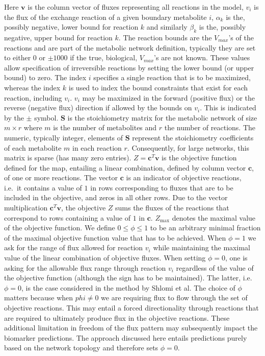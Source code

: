 \documentclass[10pt,a4paper,onecolumn]{article}
\begin{document}
Here \(\bm{v}\) is the column vector of fluxes representing all
reactions in the model, \(v_i\) is the flux of the exchange reaction of
a given boundary metabolite \(i\), \(\alpha_k\) is the, possibly
negative, lower bound for reaction \(k\) and similarly \(\beta_k\) is
the, possibly negative, upper bound for reaction \(k\). The reaction
bounds are the \(V_{max}\)'s of the reactions and are part of the
metabolic network definition, typically they are set to either \(0\) or
\(\pm 1000\) if the true, biological, \(V_{max}\)'s are not known. These
values allow specification of irreversible reactions by setting the
lower bound (or upper bound) to zero. The index \(i\) specifies a single
reaction that is to be maximized, whereas the index \(k\) is used to
index the bound constraints that exist for each reaction, including
\(v_i\). \(v_i\) may be maximized in the forward (positive flux) or the
reverse (negative flux) direction if allowed by the bounds on \(v_i\).
This is indicated by the \(\pm\) symbol. \(\bm{S}\) is the stoichiometry
matrix for the metabolic network of size \(m \times r\) where \(m\) is
the number of metabolites and \(r\) the number of reactions. The
numeric, typically integer, elements of \(\bm{S}\) represent the
stoichiometry coefficients of each metabolite \(m\) in each reaction
\(r\). Consequently, for large networks, this matrix is sparse (has many
zero entries). \(Z = \bm{c}^T \bm{v}\) is the objective function defined
for the map, entailing a linear combination, defined by column vector
\(\bm{c}\), of one or more reactions. The vector \(\bm{c}\) is an
indicator of objective reactions, i.e.~it contains a value of \(1\) in
rows corresponding to fluxes that are to be included in the objective,
and zeros in all other rows. Due to the vector multiplication
\(\bm{c}^T \bm{v}\), the objective \(Z\) sums the fluxes of the
reactions that correspond to rows containing a value of \(1\) in
\(\bm{c}\). \(Z_{\text{max}}\) denotes the maximal value of the
objective function. We define \(0 \leq \phi \leq 1\) to be an arbitrary
minimal fraction of the maximal objective function value that has to be
achieved. When \(\phi=1\) we ask for the range of flux allowed for
reaction \(v_i\) while maintaining the maximal value of the linear
combination of objective fluxes. When setting \(\phi = 0\), one is
asking for the allowable flux range through reaction \(v_i\) regardless
of the value of the objective function (although the sign has to be
maintained). The latter, i.e. \(\phi=0\), is the case considered in the
method by Shlomi et al. The choice of \(\phi\) matters because when
\(phi \neq 0\) we are requiring flux to flow through the set of
objective reactions. This may entail a forced directionality through
reactions that are required to ultimately produce flux in the objective
reactions. These additional limitation in freedom of the flux pattern
may subsequently impact the biomarker predictions. The approach
discussed here entails predictions purely based on the network topology
and therefore sets \(\phi = 0\).
\end{document}
